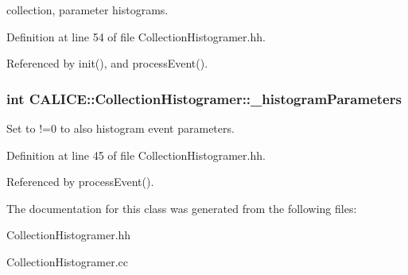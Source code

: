 collection, parameter histograms. 



Definition at line 54 of file Collection\-Histogramer.\-hh.



Referenced by init(), and process\-Event().

\subsubsection[{\-\_\-histogram\-Parameters}]{\setlength{\rightskip}{0pt plus 5cm}int C\-A\-L\-I\-C\-E\-::\-Collection\-Histogramer\-::\-\_\-histogram\-Parameters\hspace{0.3cm}{\ttfamily [protected]}}\label{classCALICE_1_1CollectionHistogramer_ac12fee356ac0d035722040ca71751aa1}


Set to !=0 to also histogram event parameters. 



Definition at line 45 of file Collection\-Histogramer.\-hh.



Referenced by process\-Event().



The documentation for this class was generated from the following files\-:\begin{DoxyCompactItemize}
\item 
Collection\-Histogramer.\-hh\item 
Collection\-Histogramer.\-cc\end{DoxyCompactItemize}
